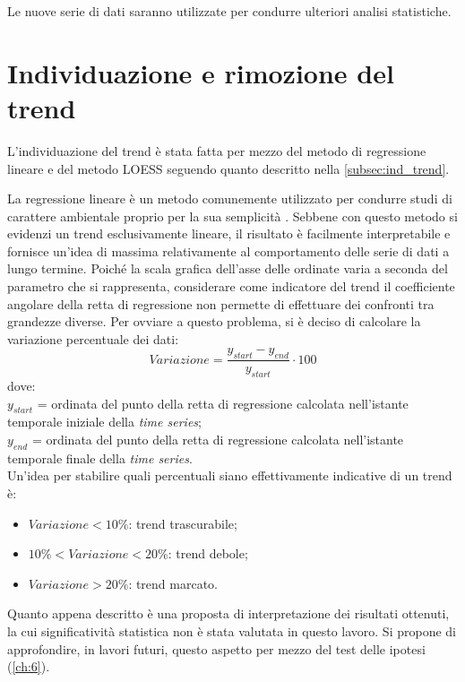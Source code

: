 Le nuove serie di dati saranno utilizzate per condurre ulteriori analisi statistiche.



\section{Individuazione e rimozione del trend}

L'individuazione del trend è stata fatta per mezzo del metodo di regressione lineare e del metodo LOESS seguendo quanto descritto nella \autoref{subsec:ind_trend}.

La regressione lineare è un metodo comunemente utilizzato per condurre studi di carattere ambientale proprio per la sua semplicità \cite{regressioneOK}. Sebbene con questo metodo si evidenzi un trend esclusivamente lineare, il risultato è facilmente interpretabile e fornisce un'idea di massima relativamente al comportamento delle serie di dati a lungo termine. Poiché la scala grafica dell'asse delle ordinate varia a seconda del parametro che si rappresenta, considerare come indicatore del trend il coefficiente angolare della retta di regressione non permette di effettuare dei confronti tra grandezze diverse. Per ovviare a questo problema, si è deciso di calcolare la variazione percentuale dei dati:
\begin{equation}
Variazione=\frac{y_{start}-y_{end}}{y_{start}}\cdot 100
\end{equation} 
dove:\\
$y_{start}$ = ordinata del punto della retta di regressione calcolata nell'istante temporale iniziale della \textit{time series};\\
$y_{end}$ =  ordinata del punto della retta di regressione calcolata nell'istante temporale finale della \textit{time series}.\\

Un'idea per stabilire quali percentuali siano effettivamente indicative di un trend è:
\begin{itemize}
	\item $Variazione<10\%$: trend trascurabile;
	\item $10\%<Variazione<20\%$: trend debole;
	\item $Variazione>20\%$: trend marcato.
\end{itemize}

Quanto appena descritto è una proposta di interpretazione dei risultati ottenuti, la cui significatività statistica non è stata valutata in questo lavoro. Si propone di approfondire, in lavori futuri, questo aspetto per mezzo del test delle ipotesi (\autoref{ch:6}).

